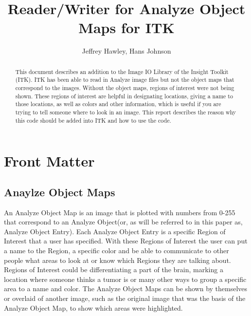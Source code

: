 \documentclass{InsightArticle}
\title{Reader/Writer for Analyze Object Maps for ITK}
\author{Jeffrey Hawley, Hans Johnson }
\begin{document}
\ifpdf
\else
\fi


\maketitle


\ifhtml
\chapter*{Front Matter\label{front}}
\fi


\begin{abstract}
\noindent
This document describes an addition to the Image IO Library of the Insight Toolkit (ITK).
ITK has been able to read in Analyze image files but not the object maps that correspond
to the images.  Without the object maps, regions of interest were not being shown.
These regions of interest are helpful in designating locations, giving a name to those
locations, as well as colors and other information, which is useful if you are trying to tell
someone where to look in an image.  This report describes the reason why this code should be
added into ITK and how to use the code.
\end{abstract}

\tableofcontents

\section{Anaylze Object Maps}
An Analyze Object Map is an image that is plotted with numbers from 0-255 that correspond to an Analyze Object(or, as will be referred to in this paper as, Analyze Object Entry).  Each Analyze Object Entry
is a specific Region of Interest that a user has specified. With these Regions of Interest the user can put a name to the Region, a specific color and be able to communicate to other people what areas to look at or know which Regions they are talking about.  Regions of Interest could be differentiating a part of the brain, marking a location where someone thinks a tumor is or many other ways to group a specific area to a name and color.  The Analyze Object Maps can be shown by themselves or overlaid of another image, such as the original image that was the basis of the Analyze Object Map, to show which areas were highlighted.
  
\end{document}
